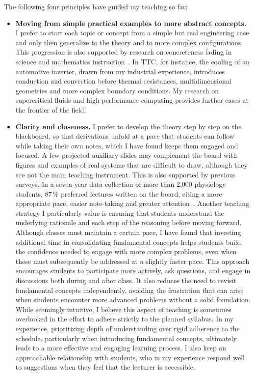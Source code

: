 \documentclass[11pt]{article}
\begin{document}
The following four principles have guided my teaching so far:
\begin{itemize}
  \item \textbf{Moving from simple practical examples to more abstract concepts.} 
  I prefer to start each topic or concept from a simple but real engineering case and only then generalize to the theory and to more complex configurations.
  This progression is also supported by research on concreteness fading in science and mathematics
  instruction~\cite{Fyfe2014}. 
  In TTC, for instance, the cooling of an automotive inverter, drawn from my industrial experience, introduces conduction and convection before thermal resistances, multidimensional geometries and more complex boundary conditions. 
  My research on supercritical fluids and high-performance computing provides further cases at the
  frontier of the field.
  
  \item \textbf{Clarity and closeness.} 
  I prefer to develop the theory step by step on the blackboard, so that derivations unfold at a pace that students can follow while taking their own notes, which I have found keeps them engaged and focused. 
  A few projected auxiliary slides may complement the board with figures and examples of real systems that are difficult to draw, although they are not the main teaching instrument.
  This is also supported by previous surveys. In a seven-year data collection of more than 2,000 physiology students, 87\,\% preferred lectures written on the board, citing a more appropriate pace, easier note-taking and greater attention~\cite{Armour2016}. Another teaching strategy I particularly value is ensuring that students understand the underlying rationale and each step of the reasoning before moving forward. Although classes must maintain a certain pace, I have found that investing additional time in consolidating fundamental concepts helps students build the confidence needed to engage with more complex problems, even when these must subsequently be addressed at a slightly faster pace. This approach encourages students to participate more actively, ask questions, and engage in discussions both during and after class. It also reduces the need to revisit fundamental concepts independently, avoiding the frustration that can arise when students encounter more advanced problems without a solid foundation. While seemingly intuitive, I believe this aspect of teaching is sometimes overlooked in the effort to adhere strictly to the planned syllabus. In my experience, prioritizing depth of understanding over rigid adherence to the schedule, particularly when introducing fundamental concepts, ultimately leads to a more effective and engaging learning process.
  I also keep an approachable relationship with students, who in my experience respond well to suggestions when
  they feel that the lecturer is accessible.
  

\end{itemize}
\end{document}
